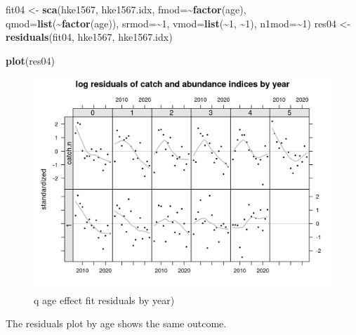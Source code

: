 \documentclass[
]{book}
\newenvironment{Shaded}{\begin{snugshade}}{\end{snugshade}}
\newcommand{\AttributeTok}[1]{\textcolor[rgb]{0.13,0.29,0.53}{#1}}
\newcommand{\DecValTok}[1]{\textcolor[rgb]{0.00,0.00,0.81}{#1}}
\newcommand{\FunctionTok}[1]{\textcolor[rgb]{0.13,0.29,0.53}{\textbf{#1}}}
\newcommand{\NormalTok}[1]{#1}
\newcommand{\OtherTok}[1]{\textcolor[rgb]{0.56,0.35,0.01}{#1}}
\newcommand{\SpecialCharTok}[1]{\textcolor[rgb]{0.81,0.36,0.00}{\textbf{#1}}}
\begin{document}
\begin{Shaded}
\begin{Highlighting}[]
\NormalTok{fit04 }\OtherTok{\textless{}{-}} \FunctionTok{sca}\NormalTok{(hke1567, hke1567.idx, }\AttributeTok{fmod=}\SpecialCharTok{\textasciitilde{}}\FunctionTok{factor}\NormalTok{(age), }\AttributeTok{qmod=}\FunctionTok{list}\NormalTok{(}\SpecialCharTok{\textasciitilde{}}\FunctionTok{factor}\NormalTok{(age)), }\AttributeTok{srmod=}\SpecialCharTok{\textasciitilde{}}\DecValTok{1}\NormalTok{, }\AttributeTok{vmod=}\FunctionTok{list}\NormalTok{(}\SpecialCharTok{\textasciitilde{}}\DecValTok{1}\NormalTok{, }\SpecialCharTok{\textasciitilde{}}\DecValTok{1}\NormalTok{),  }\AttributeTok{n1mod=}\SpecialCharTok{\textasciitilde{}}\DecValTok{1}\NormalTok{)}
\NormalTok{res04 }\OtherTok{\textless{}{-}} \FunctionTok{residuals}\NormalTok{(fit04, hke1567, hke1567.idx)}
\end{Highlighting}
\end{Shaded}

\begin{Shaded}
\begin{Highlighting}[]
\FunctionTok{plot}\NormalTok{(res04)}
\end{Highlighting}
\end{Shaded}

\begin{figure}
\centering
\includegraphics{_bookdown_files/_main_files/figure-html/fqageresbyyear-1.png}
\caption{\label{fig:fqageresbyyear}q age effect fit residuals by year)}
\end{figure}

The residuals plot by age shows the same outcome.
\end{document}

